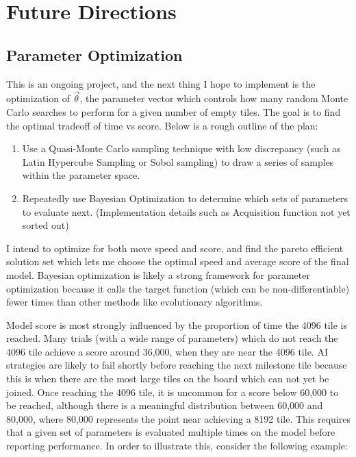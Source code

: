 \documentclass{article}
\begin{document}
\section{Future Directions}

\subsection{Parameter Optimization}

This is an ongoing project, and the next thing I hope to implement is the optimization of $\vec{\theta}$, the parameter vector which controls how many random Monte Carlo searches to perform for a given number of empty tiles.  The goal is to find the optimal tradeoff of time vs score.  Below is a rough outline of the plan:
\begin{enumerate}
	\item Use a Quasi-Monte Carlo sampling technique with low discrepancy (such as Latin Hypercube Sampling or Sobol sampling) to draw a series of samples within the parameter space.
	\item Repeatedly use Bayesian Optimization to determine which sets of parameters to evaluate next. (Implementation details such as Acquisition function not yet sorted out)
\end{enumerate}

I intend to optimize for both move speed and score, and find the pareto efficient solution set which lets me choose the optimal speed and average score of the final model.   Bayesian optimization is likely a strong framework for parameter optimization because it calls the target function (which can be non-differentiable) fewer times than other methods like evolutionary algorithms.

Model score is most strongly influenced by the proportion of time the 4096 tile is reached.  Many trials (with a wide range of parameters) which do not reach the 4096 tile achieve a score around 36,000, when they are near the 4096 tile.  AI strategies are likely to fail shortly before reaching the next milestone tile because this is when there are the most large tiles on the board which can not yet be joined.  Once reaching the 4096 tile, it is uncommon for a score below 60,000 to be reached, although there is a meaningful distribution between 60,000 and 80,000, where 80,000 represents the point near achieving a 8192 tile.   This requires that a given set of parameters is evaluated multiple times on the model before reporting performance.  In order to illustrate this, consider the following example:
\end{document}
